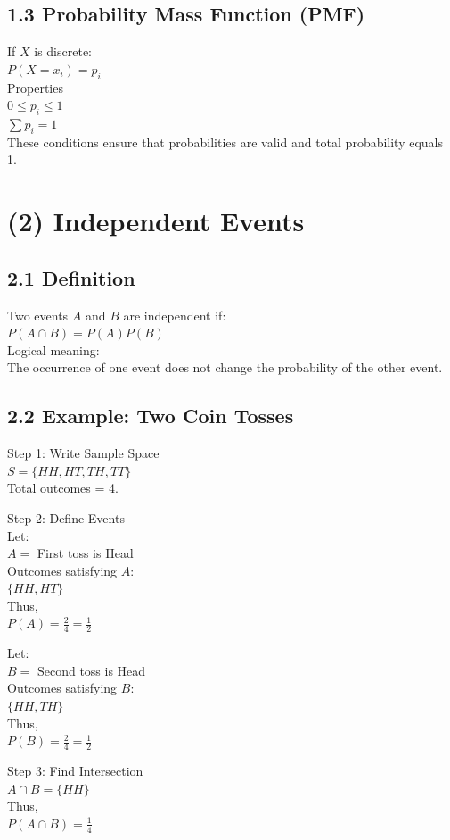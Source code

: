 \documentclass{article}
\begin{document}
\subsection{1.3 Probability Mass Function (PMF)}
If $X$ is discrete: \\
$P(X=x_i)=p_i$ \\
Properties \\
$0\le p_i\le 1$ \\
$\sum p_i=1$ \\
These conditions ensure that probabilities are valid and total probability equals 1.

\section{(2) Independent Events}

\subsection{2.1 Definition}
Two events $A$ and $B$ are independent if: \\
$P(A \cap B) = P(A)P(B)$ \\
Logical meaning: \\
The occurrence of one event does not change the probability of the other event.

\subsection{2.2 Example: Two Coin Tosses}
Step 1: Write Sample Space \\
$S=\{HH, HT, TH, TT\}$ \\
Total outcomes = 4.

Step 2: Define Events \\
Let: \\
$A=$ First toss is Head \\
Outcomes satisfying $A$: \\
$\{HH, HT\}$ \\
Thus, \\
$P(A) = \frac{2}{4} = \frac{1}{2}$

Let: \\
$B=$ Second toss is Head \\
Outcomes satisfying $B$: \\
$\{HH, TH\}$ \\
Thus, \\
$P(B) = \frac{2}{4} = \frac{1}{2}$

Step 3: Find Intersection \\
$A \cap B = \{HH\}$ \\
Thus, \\
$P(A \cap B) = \frac{1}{4}$
\end{document}
